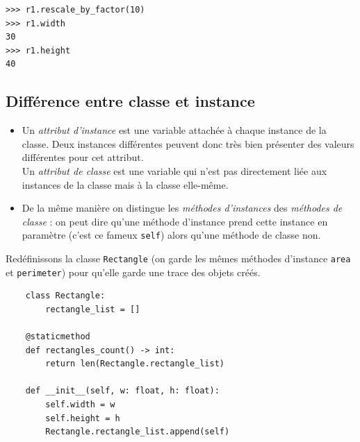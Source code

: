 \documentclass[a4paper,10pt,cours,firamath]{nsi}
\begin{document}
\begin{pyc}
    \begin{verbatim}
>>> r1.rescale_by_factor(10)
>>> r1.width
30
>>> r1.height
40
        \end{verbatim}
\end{pyc}

\subsection{Différence entre classe et instance}

\begin{definition}[s]
    \begin{itemize}
        \item     Un \textit{attribut d'instance} est une variable attachée à chaque instance de la classe. Deux instances différentes peuvent donc très bien présenter des valeurs différentes pour cet attribut.\\
              Un \textit{attribut de classe} est une variable qui n'est pas directement liée aux instances de la classe mais à la classe elle-même.
        \item     De la même manière on distingue les \textit{méthodes d'instances} des \textit{ méthodes de classe} : on peut dire qu'une méthode d'instance prend cette instance en paramètre (c'est ce fameux \texttt{self}) alors qu'une méthode de classe non.
    \end{itemize}
\end{definition}

Redéfinissons la classe \texttt{Rectangle} (on garde les mêmes méthodes d'instance \texttt{area} et \texttt{perimeter}) pour qu'elle garde une trace des objets créés.

\begin{pyc}
    \begin{verbatim}
    class Rectangle:
        rectangle_list = []
    
    @staticmethod
    def rectangles_count() -> int:
        return len(Rectangle.rectangle_list)
    
    def __init__(self, w: float, h: float):
        self.width = w
        self.height = h
        Rectangle.rectangle_list.append(self)
        \end{verbatim}
\end{pyc}
\end{document}
